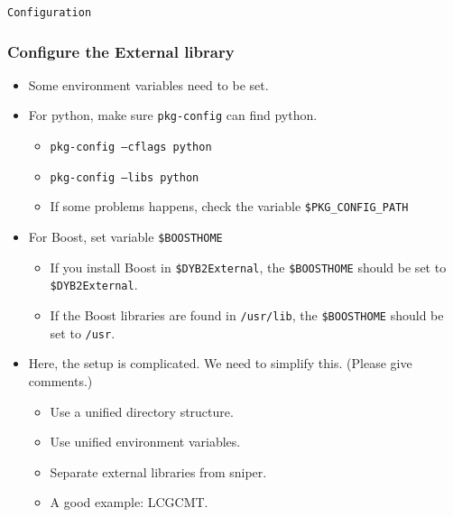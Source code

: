 \begin{frame}
    \begin{center}
        \LARGE \tt{Configuration}
    \end{center}
\end{frame}

\begin{frame}
    \frametitle{Configure the External library}
    \begin{itemize}
        \item Some environment variables need to be
            set.
        \item For python, make sure {\tt pkg-config}
            can find python.
            \begin{itemize}
                \item {\tt pkg-config --cflags python}
                \item {\tt pkg-config --libs python}
                \item If some problems happens, check
                    the variable {\tt \$PKG\_CONFIG\_PATH}
            \end{itemize}
        \item For Boost, set variable {\tt \$BOOSTHOME}
            \begin{itemize}
                \item If you install Boost in {\tt \$DYB2External},
                    the {\tt \$BOOSTHOME} should be set to
                    {\tt \$DYB2External}.
                \item If the Boost libraries are found in 
                    {\tt /usr/lib}, the {\tt \$BOOSTHOME}
                    should be set to {\tt /usr}.
            \end{itemize}
        \item Here, the setup is complicated.
            We need to simplify this. (Please give comments.)
            \begin{itemize}
                \item Use a unified directory structure.
                \item Use unified environment variables.
                \item Separate external libraries from sniper.
                \item A good example: LCGCMT.
            \end{itemize}
    \end{itemize}
\end{frame}

